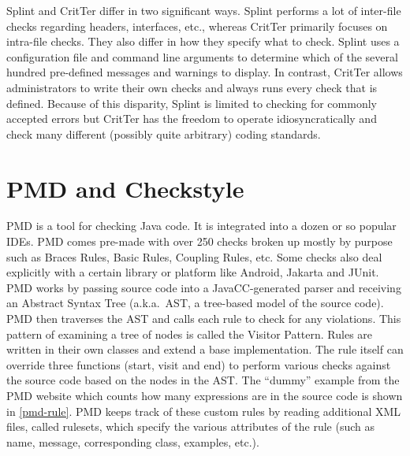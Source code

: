 \documentclass[12pt]{report}
\newcommand{\programName}{CritTer\xspace}
\begin{document}
Splint and \programName differ in two significant ways. Splint performs a lot of inter-file checks 
regarding headers, interfaces, etc., whereas \programName primarily focuses on intra-file checks. 
They also differ in how they specify what to check. Splint uses a configuration file and command line 
arguments to determine which of the several hundred pre-defined messages and warnings to display. In 
contrast, \programName allows administrators to write their own checks and always runs every check 
that is defined. Because of this disparity, Splint is limited to checking for commonly accepted errors but 
\programName has the freedom to operate idiosyncratically and check many different (possibly quite 
arbitrary) coding standards. 

\section{PMD and Checkstyle}
\label{sec:pmdAndCheckstyle}

PMD is a tool for checking Java code. It is integrated into a dozen or so popular IDEs.
PMD comes pre-made with over 250 checks broken up mostly by purpose such as Braces Rules, 
Basic Rules, Coupling Rules, etc. Some checks also deal explicitly with a certain 
library or platform like Android, Jakarta and JUnit. PMD works by passing source code into a 
JavaCC-generated parser and receiving an Abstract Syntax Tree (a.k.a.\ AST, a tree-based model of 
the source code). PMD then traverses the AST and calls each rule to check for any
violations. This pattern of examining a tree of nodes is called the Visitor Pattern\cite{design-patterns}. 
Rules are written in their own classes and extend a base implementation. The rule itself can 
override three functions (start, visit and end) to perform various checks against the source code based 
on the nodes in the AST. The ``dummy'' example from the PMD website which counts how 
many expressions are in the source code is shown in \autoref{pmd-rule}. PMD keeps track of these 
custom rules by reading additional XML files, called rulesets, which specify the various attributes of the 
rule (such as name, message, corresponding class, examples, etc.).
\end{document}
